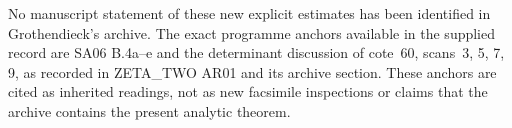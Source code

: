 No manuscript statement of these new explicit estimates has been
identified in Grothendieck's archive. The exact programme anchors
available in the supplied record are SA06 B.4a--e and the determinant
discussion of cote~60, scans~3, 5, 7, 9, as recorded in ZETA\_TWO AR01
and its archive section. These anchors are cited as inherited readings,
not as new facsimile inspections or claims that the archive contains
the present analytic theorem.
